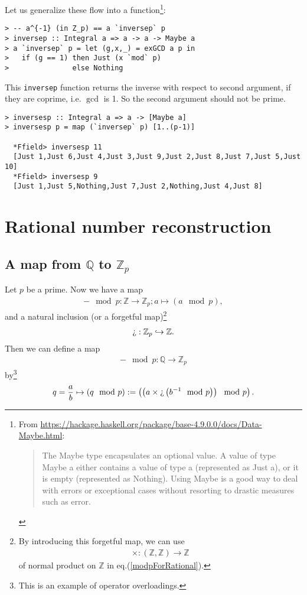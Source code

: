 \documentclass[11pt]{book}
\begin{document}
Let us generalize these flow into a function\footnote{
From \url{https://hackage.haskell.org/package/base-4.9.0.0/docs/Data-Maybe.html}:
\begin{quotation}
The Maybe type encapsulates an optional value. 
A value of type Maybe a either contains a value of type a (represented as Just a), or it is empty (represented as Nothing). 
Using Maybe is a good way to deal with errors or exceptional cases without resorting to drastic measures such as error.
\end{quotation}
}:
\begin{verbatim}  
> -- a^{-1} (in Z_p) == a `inversep` p
> inversep :: Integral a => a -> a -> Maybe a
> a `inversep` p = let (g,x,_) = exGCD a p in
>   if (g == 1) then Just (x `mod` p)
>               else Nothing
\end{verbatim}
This \texttt{inversep} function returns the inverse with respect to second argument, if they are coprime, i.e. $\gcd$ is 1.
So the second argument should not be prime.
\begin{verbatim}
> inversesp :: Integral a => a -> [Maybe a]
> inversesp p = map (`inversep` p) [1..(p-1)]

  *Ffield> inversesp 11
  [Just 1,Just 6,Just 4,Just 3,Just 9,Just 2,Just 8,Just 7,Just 5,Just 10]
  *Ffield> inversesp 9
  [Just 1,Just 5,Nothing,Just 7,Just 2,Nothing,Just 4,Just 8]
\end{verbatim}

\section{Rational number reconstruction}
\subsection{A map from $\mathbb{Q}$ to $\mathbb{Z}_p$}
Let $p$ be a prime.
Now we have a map
\begin{eqnarray}
- \mod p : \mathbb{Z} \to \mathbb{Z}_p; a \mapsto (a \mod p),
\end{eqnarray}
and a natural inclusion (or a forgetful map)\footnote{
By introducing this forgetful map, we can use 
\begin{eqnarray}
\times : (\mathbb{Z}, \mathbb{Z}) \to \mathbb{Z} 
\end{eqnarray}
of normal product on $\mathbb{Z}$ in eq.(\ref{modpForRational}).
}
\begin{eqnarray}
\text{\textquestiondown} : \mathbb{Z}_p \hookrightarrow \mathbb{Z}.
\end{eqnarray}
Then we can define a map
\begin{eqnarray}
- \mod p : \mathbb{Q} \to \mathbb{Z}_p
\end{eqnarray}
by\footnote{
This is an example of operator overloadings.
}
\begin{eqnarray}
\label{modpForRational}
q = \frac{a}{b} \mapsto (q \mod p) := \left( \left( a \times \text{\textquestiondown} \left( b^{-1} \mod p\right) \right) \mod p \right).
\end{eqnarray}
\end{document}
